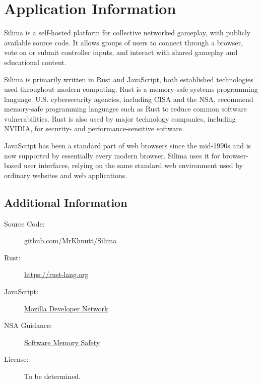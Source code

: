\section{Application Information}

Silima is a self-hosted platform for collective networked gameplay,
with publicly available source code. It allows groups of users to
connect through a browser, vote on or submit controller inputs,
and interact with shared gameplay and educational content.

Silima is primarily written in Rust and JavaScript, both established
technologies used throughout modern computing. Rust is a memory-safe
systems programming language. U.S. cybersecurity agencies, including
CISA and the NSA, recommend memory-safe programming languages such as
Rust to reduce common software vulnerabilities. Rust is also used by
major technology companies, including NVIDIA, for security- and
performance-sensitive software.

JavaScript has been a standard part of web browsers since the
mid-1990s and is now supported by essentially every modern browser.
Silima uses it for browser-based user interfaces, relying on the
same standard web environment used by ordinary websites and
web applications.

\subsection*{Additional Information}

\begin{description}
    \item[Source Code:]
    \href{https://github.com/MrKhnutt/Silima}
         {github.com/MrKhnutt/Silima}

    \item[Rust:]
    \url{https://rust-lang.org}

    \item[JavaScript:]
    \href{https://developer.mozilla.org/en-US/docs/Web/JavaScript}
         {Mozilla Developer Network}

    \item[NSA Guidance:]
    \href{https://www.nsa.gov/Press-Room/News-Highlights/Article/Article/3215760/}
         {Software Memory Safety}

    \item[License:]
    To be determined.
\end{description}
